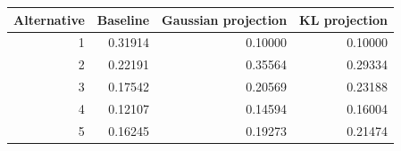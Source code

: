 \begin{tabular}{rrrr}
\toprule
Alternative & Baseline & Gaussian projection & KL projection \\
\midrule
1 & 0.31914 & 0.10000 & 0.10000 \\
2 & 0.22191 & 0.35564 & 0.29334 \\
3 & 0.17542 & 0.20569 & 0.23188 \\
4 & 0.12107 & 0.14594 & 0.16004 \\
5 & 0.16245 & 0.19273 & 0.21474 \\
\bottomrule
\end{tabular}
